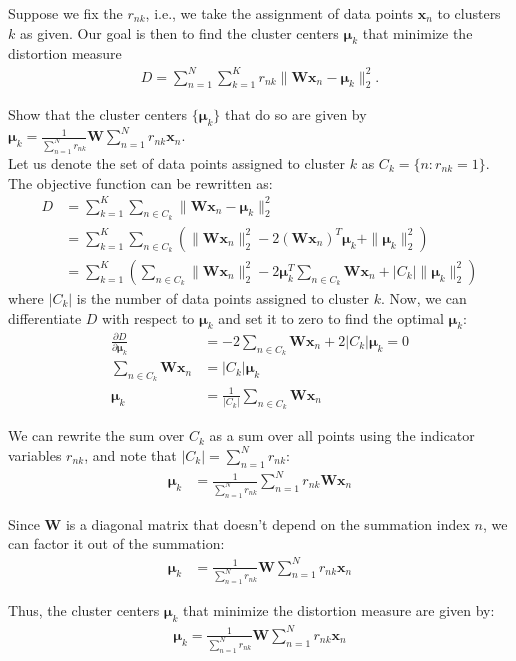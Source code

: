 \documentclass[a3paper,12pt]{extarticle} %
\begin{document}
\begin{enumerate}
Suppose we fix the $r_{nk}$, i.e., we take the assignment of data points $\mathbf{x}_n$ to clusters $k$ as given. Our goal is then to find the cluster centers $\boldsymbol{\mu}_k$ that minimize the distortion measure
\begin{align}
D = \sum_{n=1}^N \sum_{k=1}^K r_{nk} \|\mathbf{W}\mathbf{x}_n - \boldsymbol{\mu}_k\|^2_2.
\end{align}

Show that the cluster centers $\{\boldsymbol{\mu}_k\}$ that do so are given by $\boldsymbol{\mu}_k = \frac{1}{\sum_{n=1}^N r_{nk}} \mathbf{W} \sum_{n=1}^N r_{nk}\mathbf{x}_n$.
\\
Let us denote the set of data points assigned to cluster $k$ as $C_k = \{n: r_{nk} = 1\}$. The objective function can be rewritten as:
\begin{align}
D &= \sum_{k=1}^K \sum_{n \in C_k} \|\mathbf{W}\mathbf{x}_n - \boldsymbol{\mu}_k\|^2_2\\
&= \sum_{k=1}^K \sum_{n \in C_k} \left( \|\mathbf{W}\mathbf{x}_n\|^2_2 - 2(\mathbf{W}\mathbf{x}_n)^T\boldsymbol{\mu}_k + \|\boldsymbol{\mu}_k\|^2_2 \right)\\
&= \sum_{k=1}^K \left( \sum_{n \in C_k} \|\mathbf{W}\mathbf{x}_n\|^2_2 - 2\boldsymbol{\mu}_k^T \sum_{n \in C_k} \mathbf{W}\mathbf{x}_n + |C_k| \|\boldsymbol{\mu}_k\|^2_2 \right)
\end{align}
where $|C_k|$ is the number of data points assigned to cluster $k$.
Now, we can differentiate $D$ with respect to $\boldsymbol{\mu}_k$ and set it to zero to find the optimal $\boldsymbol{\mu}_k$:
\begin{align}
\frac{\partial D}{\partial \boldsymbol{\mu}_k} &= -2 \sum_{n \in C_k} \mathbf{W}\mathbf{x}_n + 2|C_k|\boldsymbol{\mu}_k = 0\\
\sum_{n \in C_k} \mathbf{W}\mathbf{x}_n &= |C_k|\boldsymbol{\mu}_k\\
\boldsymbol{\mu}_k &= \frac{1}{|C_k|} \sum_{n \in C_k} \mathbf{W}\mathbf{x}_n
\end{align}

We can rewrite the sum over $C_k$ as a sum over all points using the indicator variables $r_{nk}$, and note that $|C_k| = \sum_{n=1}^N r_{nk}$:
\begin{align}
\boldsymbol{\mu}_k &= \frac{1}{\sum_{n=1}^N r_{nk}} \sum_{n=1}^N r_{nk}\mathbf{W}\mathbf{x}_n
\end{align}

Since $\mathbf{W}$ is a diagonal matrix that doesn't depend on the summation index $n$, we can factor it out of the summation:
\begin{align}
\boldsymbol{\mu}_k &= \frac{1}{\sum_{n=1}^N r_{nk}}\mathbf{W}\sum_{n=1}^N r_{nk}\mathbf{x}_n
\end{align}

Thus, the cluster centers $\boldsymbol{\mu}_k$ that minimize the distortion measure are given by:
\begin{align}
\boldsymbol{\mu}_k = \frac{1}{\sum_{n=1}^N r_{nk}} \mathbf{W} \sum_{n=1}^N r_{nk}\mathbf{x}_n
\end{align}

\end{enumerate}
\newpage
\end{document}
